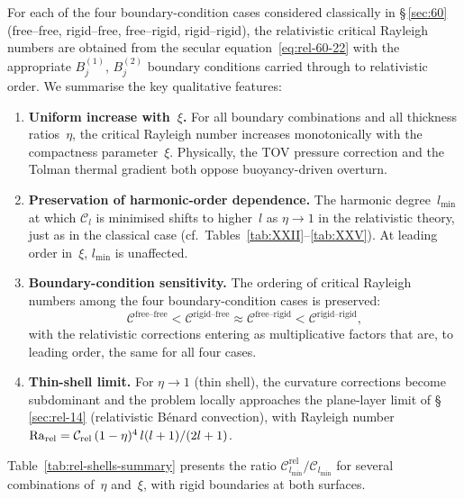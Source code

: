 For each of the four boundary-condition cases considered classically
in \S\,\ref{sec:60} (free--free, rigid--free, free--rigid,
rigid--rigid), the relativistic critical Rayleigh numbers are obtained
from the secular equation~\eqref{eq:rel-60-22} with the appropriate
$B_{j}^{(1)}$, $B_{j}^{(2)}$ boundary conditions carried through to
relativistic order.  We summarise the key qualitative features:

\begin{enumerate}
\item \textbf{Uniform increase with~$\xi$.}  For all boundary
  combinations and all thickness ratios~$\eta$, the critical
  Rayleigh number increases monotonically with the compactness
  parameter~$\xi$.  Physically, the TOV pressure correction and the
  Tolman thermal gradient both oppose buoyancy-driven overturn.

\item \textbf{Preservation of harmonic-order dependence.}  The
  harmonic degree~$l_{\min}$ at which $\mathcal{C}_{l}$ is minimised
  shifts to higher~$l$ as $\eta\to 1$ in the relativistic theory,
  just as in the classical case (cf.\ Tables~\ref{tab:XXII}--\ref{tab:XXV}).
  At leading order in~$\xi$, $l_{\min}$ is unaffected.

\item \textbf{Boundary-condition sensitivity.}  The ordering of
  critical Rayleigh numbers among the four boundary-condition cases
  is preserved:
  \begin{equation}\label{eq:rel-60-33}
  \mathcal{C}^{\text{free--free}} < \mathcal{C}^{\text{rigid--free}}
    \approx \mathcal{C}^{\text{free--rigid}}
    < \mathcal{C}^{\text{rigid--rigid}},
  \end{equation}
  with the relativistic corrections entering as multiplicative
  factors that are, to leading order, the same for all four cases.

\item \textbf{Thin-shell limit.}  For $\eta\to 1$ (thin shell), the
  curvature corrections become subdominant and the problem locally
  approaches the plane-layer limit of \S\,\ref{sec:rel-14} (relativistic
  B\'enard convection), with Rayleigh number
  $\mathrm{Ra}_{\mathrm{rel}} = \mathcal{C}_{\mathrm{rel}}\,(1-\eta)^{4}\,l(l+1)/(2l+1)$.
\end{enumerate}

Table~\ref{tab:rel-shells-summary} presents the ratio
$\mathcal{C}_{l_{\min}}^{\mathrm{rel}}/\mathcal{C}_{l_{\min}}$ for
several combinations of~$\eta$ and~$\xi$, with rigid boundaries at
both surfaces.

